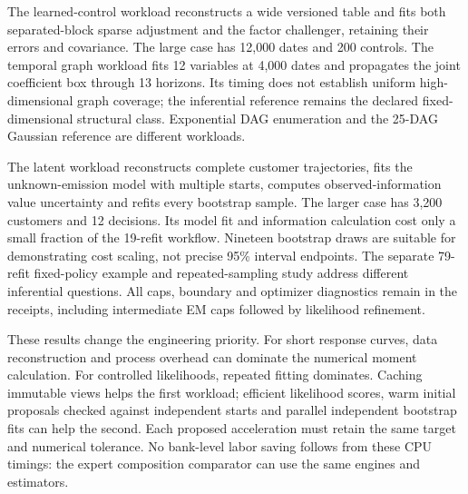 The learned-control workload reconstructs a wide versioned table and fits
both separated-block sparse adjustment and the factor challenger, retaining
their errors and covariance. The large case has 12,000 dates and 200 controls.
The temporal graph workload fits 12 variables at 4,000 dates and propagates
the joint coefficient box through 13 horizons. Its timing does not establish
uniform high-dimensional graph coverage; the inferential reference remains
the declared fixed-dimensional structural class. Exponential DAG enumeration
and the 25-DAG Gaussian reference are different workloads.

The latent workload reconstructs complete customer trajectories, fits the
unknown-emission model with multiple starts, computes observed-information
value uncertainty and refits every bootstrap sample. The larger case has
3,200 customers and 12 decisions. Its model fit and information calculation
cost only a small fraction of the 19-refit workflow. Nineteen bootstrap
draws are suitable for demonstrating cost scaling, not precise 95\% interval
endpoints. The separate 79-refit fixed-policy example and repeated-sampling
study address different inferential questions. All caps, boundary and
optimizer diagnostics remain in the receipts, including intermediate EM
caps followed by likelihood refinement.

These results change the engineering priority. For short response curves,
data reconstruction and process overhead can dominate the numerical moment
calculation. For controlled likelihoods, repeated fitting dominates.
Caching immutable views helps the first workload; efficient likelihood
scores, warm initial proposals checked against independent starts and
parallel independent bootstrap fits can help the second. Each proposed
acceleration must retain the same target and numerical tolerance. No
bank-level labor saving follows from these CPU timings: the expert
composition comparator can use the same engines and estimators.

